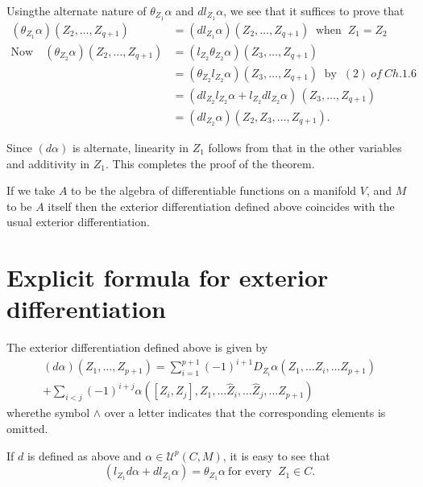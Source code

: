  Using\pageoriginale the alternate nature of $\theta_{Z_1} \alpha$ and $d l_{Z_1}
 \alpha$, we see that it suffices to prove that 
\begin{align*}
  (\theta_{Z_1} \alpha )(Z_2, \ldots , Z_{q+1}) & = (d
  l_{Z_1}\alpha)(Z_2, \ldots , Z_{q+1}) ~ \text{ when }  ~ Z_1 = Z_2 \\
  \text{Now} \quad (\theta_{Z_2} \alpha) (Z_2, \ldots , Z_{q+1}) & =(l_{Z_2}
  \theta_{Z_2} \alpha) (Z_3, \ldots  , Z_{q+1}) \\ 
  &= (\theta_{Z_2} l_{Z_2} \alpha) (Z_3, \ldots , Z_{q+1}) ~ \text{ by
  } ~(2)~ of ~Ch. 1.6 \\ 
  &=(d l_{Z_2} l_{Z_2} \alpha + l_{Z_2} d l_{Z_2} \alpha) \,(Z_3, \ldots
  , Z_{q+1}) \\ 
  &=(d l_{Z_2} \alpha) (Z_2, Z_3, \ldots , Z_{q+1}).
 \end{align*} 
 
 Since $(d\alpha)$ is alternate, linearity in $Z_1$ follows from that
 in the other variables and additivity in $Z_1$.  This completes the
 proof of the theorem. 

\begin{remark*}
  If we take $A$ to be the algebra of differentiable functions on a
  manifold $V$, and $M$ to be $A$ itself then the exterior
  differentiation defined above coincides with the usual exterior
  differentiation. 
\end{remark*} 

\section{Explicit formula for exterior differentiation}\label{chap1:sec7} %

\begin{lem}\label{chap1:sec7:lem2} %
  The exterior differentiation defined above is given by 
  \begin{multline*}
  (d \alpha) (Z_1,  \ldots , Z_{p+1}) = \sum_{i=1}^{p+1} (-1)^{i+1}
  D_{Z_i} \alpha (Z_1, \ldots Z_i, \ldots Z_{p+1})\\ 
  + \sum_{i <
    j}(-1)^{i+j} \alpha ( [Z_i, Z_j], Z_1, \ldots \hat{Z}_i , \ldots
  \hat{Z}_j , \ldots Z_{p+1}) 
  \end{multline*}
  where\pageoriginale the symbol $\wedge$ over a  letter indicates that the
  corresponding elements is omitted. 
\end{lem} 
 
 If $d$ is defined as above and $\alpha \in \mathscr{U}^p (C,M)$, it
 is easy to see that  
  $$
 (l_{Z_1} d \alpha + d l_{Z_1} \alpha) = \theta_{Z_1} \alpha  ~ \text{
   for every } ~ Z_1 \in C.  
 $$
 
